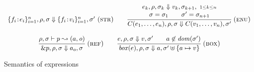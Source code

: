 \begin{figure}
{{$$\begin{array}{c}
{\begin{array}{c}
      \end{array}
    }
    {
      \{f_i\!:\!e_i\}_{i=1}^n,\rho,\sigma\Downarrow \{f_i\!:\!v_i\}_{i=1}^n, \sigma'
    }~{\textsc{(str)}}
    \qquad
    \cfrac{
      \begin{array}{c}
      e_k, \rho,\sigma_k \Downarrow  v_k,\sigma_{k+1},~{\scriptstyle{1\leq k \leq n}} \\
    \sigma =\sigma_1 \qquad \sigma'=\sigma_{n+1}
      \end{array}
    }
    {C(e_1,\ldots,e_n),\rho,\sigma \Downarrow C(v_1,\ldots,v_n), \sigma' }~{\textsc{(enu)}}
    \\\\
    \cfrac{\rho, \sigma \vdash p \leadsto (a, {\mathit{o}})}
    {\&p, \rho, \sigma \Downarrow a_o,\sigma}~{\textsc{(ref)}}
    \qquad{}
    \cfrac{
        e,\rho,\sigma \Downarrow v,\sigma' \qquad
        a \not \in {\mathit{dom}}(\sigma')
    }
    {{\mathit{box}(e)},\rho,\sigma \Downarrow  a,\sigma' \uplus \{a \mapsto v\}}~{\textsc{(box)}}
  \end{array}
$$
    }}
\caption{Semantics of expressions}
\label{sem-expr:fig-rules}
\end{figure}